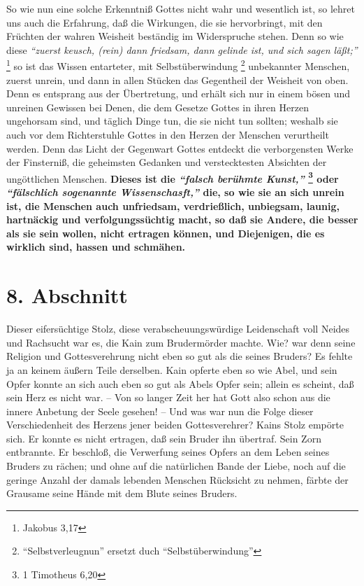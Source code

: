 So wie nun eine solche Erkenntniß Gottes nicht wahr und wesentlich ist, so
lehret uns auch die Erfahrung, daß die Wirkungen, die sie hervorbringt, mit den
Früchten der wahren Weisheit beständig im Widerspruche stehen. Denn so wie diese
\textit{"`zuerst keusch, (rein) dann friedsam, dann gelinde ist, und sich sagen
läßt;"'}
\footnote{Jakobus 3,17}
so ist das Wissen entarteter, mit Selbstüberwindung \footnote{"`Selbstverleugnun"' ersetzt duch "`Selbstüberwindung"'}
unbekannter Menschen, zuerst unrein, und dann in allen Stücken das Gegentheil
der Weisheit von oben. Denn es entsprang aus der Übertretung, und erhält sich
nur in einem bösen und unreinen Gewissen bei Denen, die dem Gesetze Gottes in
ihren Herzen ungehorsam sind, und täglich Dinge tun, die sie nicht tun
sollten; weshalb sie auch vor dem Richterstuhle Gottes in den Herzen der
Menschen verurtheilt werden. Denn das Licht der Gegenwart Gottes entdeckt die
verborgensten Werke der Finsterniß, die geheimsten Gedanken  und verstecktesten
Absichten der ungöttlichen Menschen. \textbf{Dieses ist die
\textit{"`falsch berühmte Kunst,"'}
\footnote{1 Timotheus 6,20}
oder  \textit{"`fälschlich sogenannte Wissenschasft,"'}
die, so wie sie an sich unrein  ist, die Menschen auch unfriedsam, verdrießlich,
unbiegsam, launig, hartnäckig und verfolgungssüchtig macht, so daß sie Andere,
die besser als sie sein wollen, nicht ertragen können, und Diejenigen, die es
wirklich sind, hassen und schmähen.}

\section{8. Abschnitt} \label{kap7_ab8}

Dieser eifersüchtige Stolz, diese verabscheuungswürdige Leidenschaft voll Neides
und Rachsucht war es, die Kain  zum Brudermörder  machte. Wie? war denn seine
Religion und Gottesverehrung nicht eben so gut als die seines Bruders? Es fehlte
ja an keinem äußern Teile derselben. Kain  opferte eben so wie Abel, und sein
Opfer konnte an sich auch eben so gut als Abels Opfer sein; allein es scheint,
daß sein Herz es nicht war. -- Von so langer Zeit her hat Gott also schon aus
die innere Anbetung der Seele gesehen! -- Und was war nun die Folge dieser
Verschiedenheit des Herzens jener beiden Gottesverehrer? Kains Stolz empörte
sich. Er konnte es nicht ertragen, daß sein Bruder ihn übertraf. Sein Zorn
entbrannte. Er beschloß, die Verwerfung seines Opfers an dem Leben seines
Bruders zu rächen; und ohne auf die natürlichen Bande der Liebe, noch auf die
geringe Anzahl der damals lebenden Menschen Rücksicht zu nehmen, färbte der
Grausame seine Hände mit dem Blute seines Bruders.

